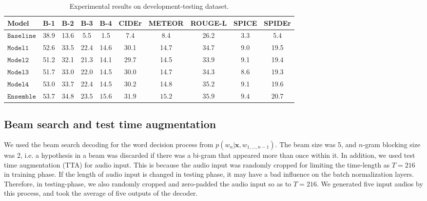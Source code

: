 \documentclass{article}
\begin{document}
\begin{sloppy}
\begin{table*}[ttt]
\caption{Experimental results on development-testing dataset.}
\label{tab:result}
\centering
\begin{tabular}{ l | ccccccccc }
\toprule
\textbf{Model} 	& \textbf{B-1}	& \textbf{B-2}	& \textbf{B-3}	& \textbf{B-4}	& \textbf{CIDEr}	& \textbf{METEOR}	& \textbf{ROUGE-L} & \textbf{SPICE} & \textbf{SPIDEr} \\	
\midrule
$\mathtt{Baseline}$		& 38.9		& 13.6		& 5.5			& 1.5			& 7.4			& 8.4			& 26.2	& 3.3 	& 5.4 \\
\midrule 
$\mathtt{Model1}$		& 52.6		& 33.5		& 22.4			& 14.6      	& 30.1			& 14.7			& 34.7	& 9.0 	& 19.5 \\
$\mathtt{Model2}$		& 51.2		& 32.1		& 21.3			& 14.1			& 29.7			& 14.5			& 33.9	& 9.1 	& 19.4 \\
$\mathtt{Model3}$		& 51.7		& 33.0		& 22.0			& 14.5			& 30.0			& 14.7			& 34.3	& 8.6 	& 19.3 \\
$\mathtt{Model4}$		& 53.0		& 33.7		& 22.4			& 14.5			& 30.2			& 14.8			& 35.2	& 9.1 	& 19.6 \\
\midrule
$\mathtt{Ensemble}$		& $\bm{53.7}$&$\bm{34.8}$& $\bm{23.5}$   & $\bm{15.6}$	& $\bm{31.9}$	& $\bm{15.2}$	& $\bm{35.9}$	& $\bm{9.4}$	& $\bm{20.7}$	 \\
\bottomrule
\end{tabular}
\vspace{-5pt}
\end{table*}


\subsection{Beam search and test time augmentation}

We used the beam search decoding for the word decision process from $p( w_n | \bm{x}, w_{1,..., n-1} )$. The beam size was 5, and $n$-gram blocking size was 2, i.e. a hypothesis in a beam was discarded if there was a bi-gram that appeared more than once within it.
In addition, we used test time augmentation (TTA) for audio input.
This is because the audio input was randomly cropped for limiting the time-length as $T=216$ in training phase.
If the length of audio input is changed in testing phase, it may have a bad influence on the batch normalization layers.
Therefore, in testing-phase, we also randomly cropped and zero-padded the audio input so as to $T=216$.
We generated five input audios by this process, and took the average of five outputs of the decoder.


\end{sloppy}
\end{document}
